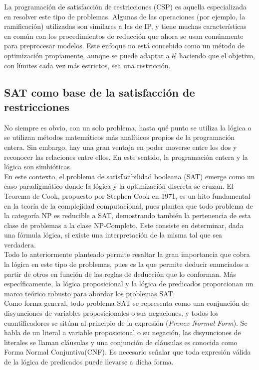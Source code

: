 \documentclass[12pt]{report}
\begin{document}
La programación de satisfacción de restricciones (CSP) es aquella especializada en resolver este tipo de problemas. Algunas de las operaciones (por ejemplo, la ramificación) utilizadas son similares a las de IP, y tiene muchas características en común con los procedimientos de reducción que ahora se usan comúnmente para preprocesar modelos. Este enfoque no está concebido como un método de optimización propiamente, aunque se puede adaptar a él haciendo que el objetivo, con límites cada vez más estrictos, sea una restricción.

\subsection{SAT como base de la satisfacción de restricciones}

No siempre es obvio, con un solo problema, hasta qué punto se utiliza la lógica o se utilizan métodos matemáticos más analíticos propios de la programación entera. Sin embargo, hay una gran ventaja en poder moverse entre los dos y reconocer las relaciones entre ellos. En este sentido, la programación entera y la lógica son simbióticas.\\

En este contexto, el problema de satisfacibilidad booleana (SAT) emerge como un caso paradigmático donde la lógica y la optimización discreta se cruzan. El Teorema de Cook, propuesto por Stephen Cook en 1971, es un hito fundamental en la teoría de la complejidad computacional, pues plantea que todo problema de la categoría NP es reducible a SAT, demostrando también la pertenencia de esta clase de problemas a la clase NP-Completo. Este consiste en determinar, dada una fórmula lógica, si existe una interpretación de la misma tal que sea verdadera.\\ 

Todo lo anteriormente planteado permite resaltar la gran importancia que cobra la lógica en este tipo de problemas, pues es la que permite deducir enunciados a partir de otros en función de las reglas de deducción que lo conforman. Más específicamente, la lógica proposicional y la lógica de predicados proporcionan un marco teórico robusto para abordar los problemas SAT.\\

Como forma general, todo problema SAT se representa como una conjunción de disyunciones de variables proposicionales o sus negaciones, y todos los cuantificadores se sitúan al principio de la expresión (\textit{Prenex Normal Form}). Se habla de un literal a variable proposicional o su negación, las disyunciones de literales se llaman cláusulas y una conjunción de cláusulas es conocida como Forma Normal Conjuntiva(CNF). Es necesario señalar que toda expresión válida de la lógica de predicados puede llevarse a dicha forma.
\end{document}
